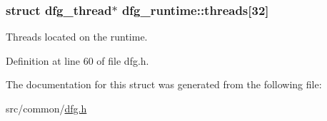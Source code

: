 \hypertarget{structdfg__runtime_a4b28fe6113c7edf2f4defb4edee42078}{
\subsubsection[{threads}]{\setlength{\rightskip}{0pt plus 5cm}struct {\bf dfg\-\_\-thread}$\ast$ dfg\-\_\-runtime\-::threads\mbox{[}32\mbox{]}}}\label{structdfg__runtime_a4b28fe6113c7edf2f4defb4edee42078}


Threads located on the runtime. 



Definition at line 60 of file dfg.\-h.



The documentation for this struct was generated from the following file\-:\begin{DoxyCompactItemize}
\item 
src/common/\hyperlink{dfg_8h}{dfg.\-h}\end{DoxyCompactItemize}
